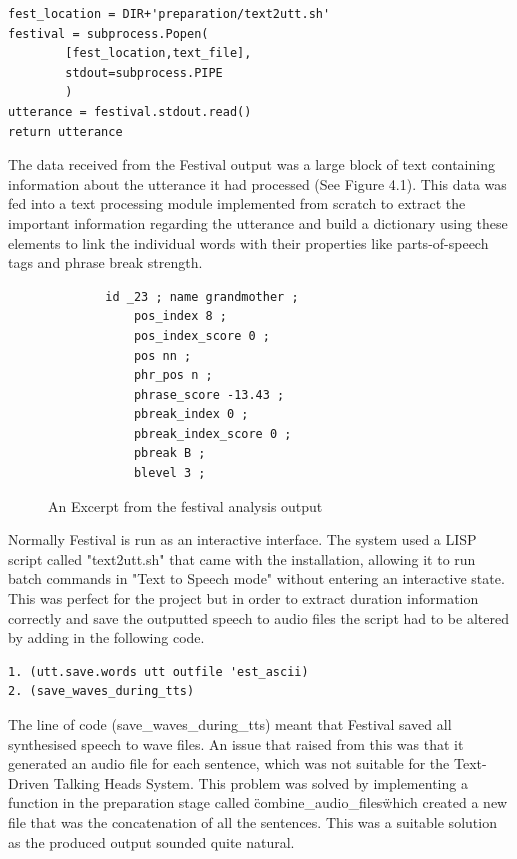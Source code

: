 \documentclass[bsc,frontabs,twoside,singlespacing,parskip]{infthesis}
\begin{document}
\begin{lstlisting}
fest_location = DIR+'preparation/text2utt.sh'
festival = subprocess.Popen(
		[fest_location,text_file], 
		stdout=subprocess.PIPE
		)
utterance = festival.stdout.read()
return utterance
\end{lstlisting}

The data received from the Festival output was a large block of text containing information about the utterance it had processed (See Figure 4.1). This data was fed into a text processing module implemented from scratch to extract the important information regarding the utterance and build a dictionary using these elements to link the individual words with their properties like parts-of-speech tags and phrase break strength.

\begin{figure}
	\begin{lstlisting}
		id _23 ; name grandmother ;
			pos_index 8 ;
			pos_index_score 0 ;
			pos nn ; 
			phr_pos n ; 
			phrase_score -13.43 ; 
			pbreak_index 0 ; 
			pbreak_index_score 0 ; 
			pbreak B ; 
			blevel 3 ; 
	\end{lstlisting}
	\caption{An Excerpt from the festival analysis output}
\end{figure}


Normally Festival is run as an interactive interface. The system used a LISP script called "text2utt.sh" that came with the installation, allowing it to run batch commands in "Text to Speech mode" without entering an interactive state. This was perfect for the project but in order to extract duration information correctly and save the outputted speech to audio files the script had to be altered by adding in the following code. 

\begin{lstlisting}
1. (utt.save.words utt outfile 'est_ascii) 
2. (save_waves_during_tts)
\end{lstlisting}

The line of code (save\_waves\_during\_tts) meant that Festival saved all synthesised speech to wave files. An issue that raised from this was that it generated an audio file for each sentence, which was not suitable for the Text-Driven Talking Heads System. This problem was solved by implementing a function in the preparation stage called \"combine\_audio\_files\" which created a new file that was the concatenation of all the sentences. This was a suitable solution as the produced output sounded quite natural.
\end{document}
